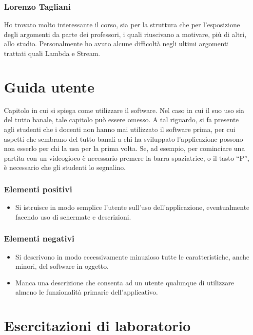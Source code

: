 \documentclass[a4paper,12pt]{report}
\begin{document}
\subsection{Lorenzo Tagliani}
Ho trovato molto interessante il corso, sia per la struttura che per l'esposizione degli argomenti da parte dei professori, i quali riuscivano a motivare, più di altri,
allo studio. Personalmente ho avuto alcune difficoltà negli ultimi argomenti trattati quali Lambda e Stream.
\appendix
\chapter{Guida utente}

Capitolo in cui si spiega come utilizzare il software. Nel caso in cui il suo uso sia del tutto
banale, tale capitolo può essere omesso.
%
A tal riguardo, si fa presente agli studenti che i docenti non hanno mai utilizzato il software
prima, per cui aspetti che sembrano del tutto banali a chi ha sviluppato l'applicazione possono non
esserlo per chi la usa per la prima volta.
%
Se, ad esempio, per cominciare una partita con un videogioco è necessario premere la barra
spaziatrice, o il tasto ``P'', è necessario che gli studenti lo segnalino.

\subsection*{Elementi positivi}

\begin{itemize}
	\item Si istruisce in modo semplice l'utente sull'uso dell'applicazione, eventualmente facendo uso di schermate e descrizioni.
\end{itemize}

\subsection*{Elementi negativi}
\begin{itemize}
	\item Si descrivono in modo eccessivamente minuzioso tutte le caratteristiche, anche minori, del software in oggetto.
	\item Manca una descrizione che consenta ad un utente qualunque di utilizzare almeno le funzionalità primarie dell'applicativo.
\end{itemize}

\chapter{Esercitazioni di laboratorio}
\end{document}
